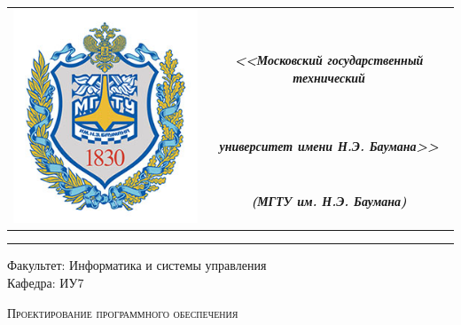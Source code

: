 \begin{titlepage}

    \begin{table}[H]
        \centering
        \begin{tabular}{cc}
            \multirow{4}{*}{\includegraphics[scale=0.3]{../bmstu.jpg}}
            & \\
            & \large \textit{\textbf{<<Московский государственный технический}} \\
            & \large \textit{\textbf{университет имени Н.Э. Баумана>>}}\\
            & \large \textit{\textbf{(МГТУ им. Н.Э. Баумана)}}\\
        \end{tabular}
    \end{table}

    \begin{flushleft}
        \rule{\textwidth}{3pt}
    \end{flushleft}

    \begin{flushleft}
        \Large
        Факультет: Информатика и системы управления \\
        Кафедра: ИУ7
    \end{flushleft}

    \vspace{2cm}

    \begin{center}
        \LARGE
        \textsc{Проектирование программного обеспечения}
    \end{center}

    \vspace{3cm}

    \begin{center}
        \large


\end{center}
\end{titlepage}
